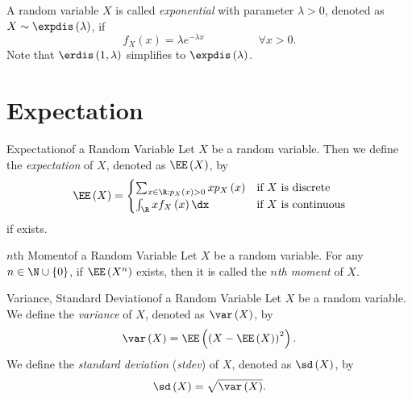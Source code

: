 \documentclass[stat333]{subfiles}
\begin{document}
    \np[Exponential]A random variable $X$ is called \emph{exponential} with parameter $\lambda>0$, denoted as $X\sim\expdis\left( \lambda \right)$, if
    \begin{equation*}
        f_X\left( x \right) = \lambda e^{-\lambda x} \hspace{2cm}\forall x>0.
    \end{equation*}
    Note that $\erdis\left( 1,\lambda \right)$ simplifies to $\expdis\left( \lambda \right)$.

    \section{Expectation}
    
    \begin{definition}{Expectation}{of a Random Variable}
        Let $X$ be a random variable. Then we define the \emph{expectation} of $X$, denoted as $\EE\left( X \right)$, by
        \begin{equation*}
            \EE\left( X \right) = 
            \begin{cases} 
                \sum^{}_{x\in\R: p_X\left( x \right) >0}xp_X\left( x \right) & \text{if }X\text{ is discrete} \\
                \int^{}_{\R} xf_X\left( x \right) \dx & \text{if }X\text{ is continuous}
            \end{cases}
        \end{equation*}
        if exists.
    \end{definition}

    \begin{definition}{$n$th Moment}{of a Random Variable}
        Let $X$ be a random variable. For any $n\in\N\cup\left\lbrace 0 \right\rbrace $, if $\EE\left( X^n \right)$ exists, then it is called the \emph{$n$th moment} of $X$.
    \end{definition}

    \begin{definition}{Variance, Standard Deviation}{of a Random Variable}
        Let $X$ be a random variable. We define the \emph{variance} of $X$, denoted as $\var\left( X \right)$, by
        \begin{equation*}
            \var\left( X \right) = \EE\left( \left( X-\EE\left( X \right)  \right) ^{2}  \right) .
        \end{equation*}
        We define the \emph{standard deviation} (\emph{stdev}) of $X$, denoted as $\sd\left( X \right)$, by
        \begin{equation*}
            \sd\left( X \right) = \sqrt{\var\left( X \right) }.
        \end{equation*}
    \end{definition}
\end{document}
